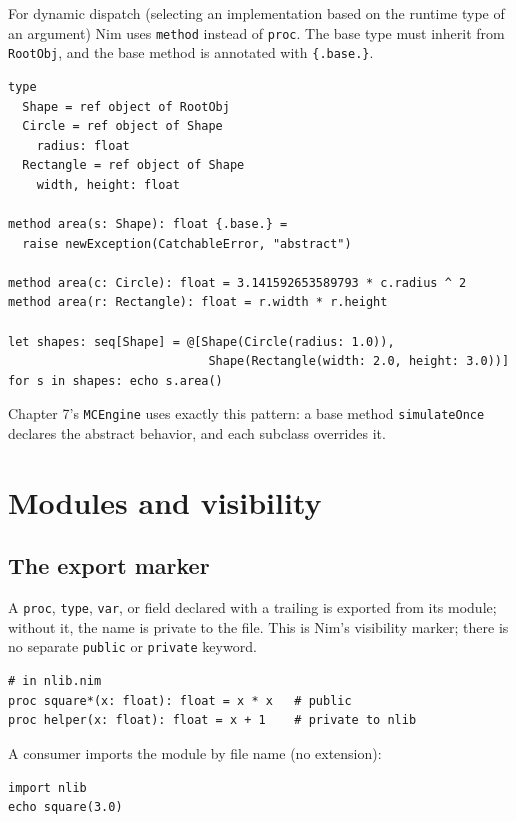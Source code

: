 \documentclass[justified, sixbynine]{tufte-book}
\def\ft{\small\tt}
\theoremstyle{plain}%
\newtheorem * {corollary}{Corollary}
\theoremstyle{definition}
\theoremstyle{remark}
\newtheorem * {remark}{Remark}
\newtheorem * {note}{Note}
\begin{document}
\begin{fullwidth}

For dynamic dispatch (selecting an implementation based on the runtime type of an argument) Nim uses {\ft method} instead of {\ft proc}. The base type must inherit from {\ft RootObj}, and the base method is annotated with {\ft \{.base.\}}.

\begin{lstlisting}
type
  Shape = ref object of RootObj
  Circle = ref object of Shape
    radius: float
  Rectangle = ref object of Shape
    width, height: float

method area(s: Shape): float {.base.} =
  raise newException(CatchableError, "abstract")

method area(c: Circle): float = 3.141592653589793 * c.radius ^ 2
method area(r: Rectangle): float = r.width * r.height

let shapes: seq[Shape] = @[Shape(Circle(radius: 1.0)),
                            Shape(Rectangle(width: 2.0, height: 3.0))]
for s in shapes: echo s.area()
\end{lstlisting}

Chapter 7's {\ft MCEngine} uses exactly this pattern: a base method {\ft simulateOnce} declares the abstract behavior, and each subclass overrides it.

\goodbreak\section{Modules and visibility}

\goodbreak\subsection{The export marker {\ft *}}

A {\ft proc}, {\ft type}, {\ft var}, or field declared with a trailing {\ft *} is exported from its module; without it, the name is private to the file. This is Nim's visibility marker; there is no separate {\ft public} or {\ft private} keyword.

\begin{lstlisting}
# in nlib.nim
proc square*(x: float): float = x * x   # public
proc helper(x: float): float = x + 1    # private to nlib
\end{lstlisting}

A consumer imports the module by file name (no extension):

\begin{lstlisting}
import nlib
echo square(3.0)
\end{lstlisting}


\end{fullwidth}
\end{document}
